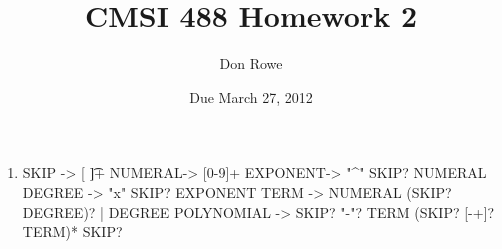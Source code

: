 \documentclass[landscape]{report}
\title{CMSI 488 Homework 2}
\author{Don Rowe}
\date{Due March 27, 2012}
\begin{document}
  \maketitle
  
  \begin{enumerate}
    \item %
      SKIP -> [ \t]+
      NUMERAL-> [0-9]+
      EXPONENT-> "^" SKIP? NUMERAL
      DEGREE -> "x" SKIP? EXPONENT
      TERM -> NUMERAL (SKIP? DEGREE)? | DEGREE
      POLYNOMIAL -> SKIP? "-"? TERM (SKIP? [-+]? TERM)* SKIP?
  
  \end{enumerate}
\end{document}
